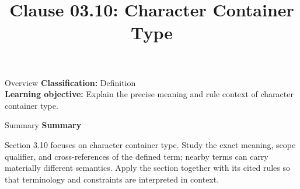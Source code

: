 \documentclass[10pt,letterpaper]{article}
\title{Clause 03.10: Character Container Type}
\author{}
\date{}
\begin{document}
\maketitle
\begin{CornellOverviewBox}{Overview}
\textbf{Classification:} Definition\\[2pt]
\textbf{Learning objective:} Explain the precise meaning and rule context of character container type.
\end{CornellOverviewBox}\begin{CornellSummaryBox}{Summary}
{\sffamily\bfseries\color{Accent} Summary}\par\vspace{3pt}Section 3.10 focuses on character container type. Study the exact meaning, scope qualifier, and cross-references of the defined term; nearby terms can carry materially different semantics. Apply the section together with its cited rules so that terminology and constraints are interpreted in context.
\end{CornellSummaryBox}
\end{document}
